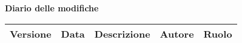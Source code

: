 \documentclass[PianoDiProgetto.tex]{subfiles}
\begin{document}
\huge \bfseries Diario delle modifiche\\
\begin{table}[htbp]
	\centering
	\renewcommand\arraystretch{1.2}

	\begin{tabularx}{\textwidth}{p{2cm}|p{2cm}|p{3cm}|p{2cm}|p{3cm}}
		\hline
		\textbf{Versione} & \textbf{Data} & \textbf{Descrizione} & \textbf{Autore} & \textbf{Ruolo}\\
		\hline
	
	\end{tabularx}

\end{table}
\end{document}
